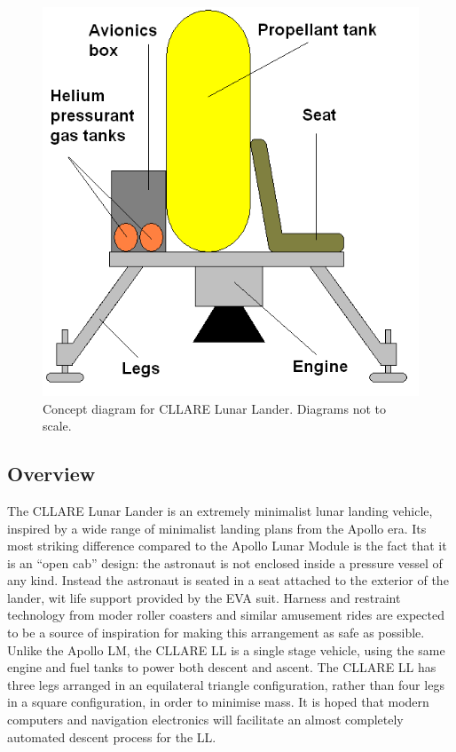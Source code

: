 \documentclass{report}
\begin{document}
\begin{figure}[h] \label{fig:ll}
\centering
\includegraphics[scale=0.6]{images/cllare_ll_concept_labelled}
\caption{Concept diagram for CLLARE Lunar Lander.  Diagrams not to scale.}
\end{figure}

\subsection{Overview}

The CLLARE Lunar Lander is an extremely minimalist lunar landing vehicle, inspired by a wide range of minimalist landing plans from the Apollo era.  Its most striking difference compared to the Apollo Lunar Module is the fact that it is an ``open cab'' design: the astronaut is not enclosed inside a pressure vessel of any kind.  Instead the astronaut is seated in a seat attached to the exterior of the lander, wit life support provided by the EVA suit.  Harness and restraint technology from moder roller coasters and similar amusement rides are expected to be a source of inspiration for making this arrangement as safe as possible.  Unlike the Apollo LM, the CLLARE LL is a single stage vehicle, using the same engine and fuel tanks to power both descent and ascent.  The CLLARE LL has three legs arranged in an equilateral triangle configuration, rather than four legs in a square configuration, in order to minimise mass.  It is hoped that modern computers and navigation electronics will facilitate an almost completely automated descent process for the LL.
\end{document}
